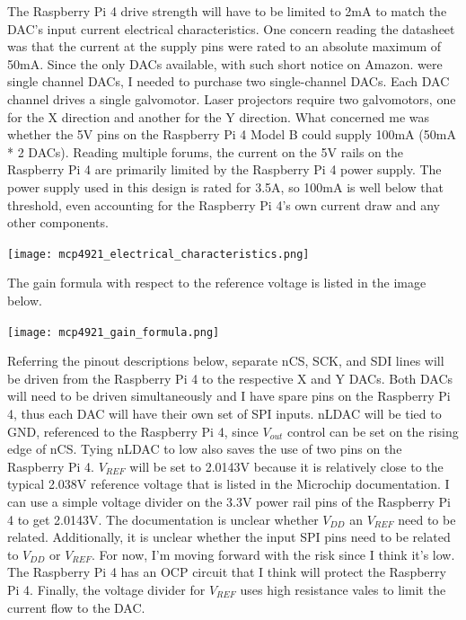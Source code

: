 \documentclass[journal]{IEEEtran}
\begin{document}
    The Raspberry Pi 4 drive strength will have to be limited to 2mA to match the DAC's input current electrical characteristics.
    One concern reading the datasheet was that the current at the supply pins were rated to an absolute maximum of 50mA.
    Since the only DACs available, with such short notice on Amazon. were single channel DACs, I needed to purchase two single-channel DACs.
    Each DAC channel drives a single galvomotor. 
    Laser projectors require two galvomotors, one for the X direction and another for the Y direction.
    What concerned me was whether the 5V pins on the Raspberry Pi 4 Model B could supply 100mA (50mA * 2 DACs).
    Reading multiple forums, the current on the 5V rails on the Raspberry Pi 4 are primarily limited by the Raspberry Pi 4 power supply.
    The power supply used in this design is rated for 3.5A, so 100mA is well below that threshold, even accounting for the Raspberry Pi 4's own current draw and any other components. \newline 

    \texttt{[image: mcp4921\_electrical\_characteristics.png]}

    The gain formula with respect to the reference voltage is listed in the image below. \newline

    \texttt{[image: mcp4921\_gain\_formula.png]}

    Referring the pinout descriptions below, separate nCS, SCK, and SDI lines will be driven from the Raspberry Pi 4 to the respective X and Y DACs.
    Both DACs will need to be driven simultaneously and I have spare pins on the Raspberry Pi 4, thus each DAC will have their own set of SPI inputs.
    nLDAC will be tied to GND, referenced to the Raspberry Pi 4, since $V_{out}$ control can be set on the rising edge of nCS.
    Tying nLDAC to low also saves the use of two pins on the Raspberry Pi 4.
    $V_{REF}$ will be set to 2.0143V because it is relatively close to the typical 2.038V reference voltage that is listed in the Microchip documentation.
    I can use a simple voltage divider on the 3.3V power rail pins of the Raspberry Pi 4 to get 2.0143V.
    The documentation is unclear whether $V_{DD}$ an $V_{REF}$ need to be related.
    Additionally, it is unclear whether the input SPI pins need to be related to $V_{DD}$ or $V_{REF}$.
    For now, I'm moving forward with the risk since I think it's low.
    The Raspberry Pi 4 has an OCP circuit that I think will protect the Raspberry Pi 4.
    Finally, the voltage divider for $V_{REF}$ uses high resistance vales to limit the current flow to the DAC. \newline
\end{document}
